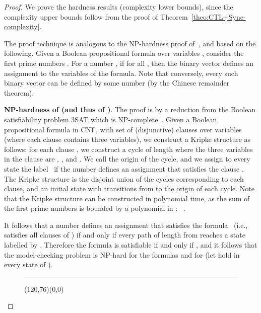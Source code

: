 \documentclass{article}
\begin{document}
\begin{proof}
We prove the hardness results (complexity lower bounds), since the complexity 
upper bounds follow from the proof of Theorem~\ref{theo:CTL+Sync-complexity}. 




The proof technique is analogous to the NP-hardness proof of~\cite[Theorem 6.1]{SM73},
and based on the following. Given a Boolean propositional formula  over variables
, consider the first  prime numbers . 
For a number , if  for all ,
then the binary vector  defines an assignment 
to the variables of the formula. Note that conversely, every such binary vector 
can be defined by some number  (by the Chinese remainder theorem).

{\bf NP-hardness of  (and thus of )}. 
The proof is by a reduction from the Boolean satisfiability problem 3SAT which is NP-complete~\cite{Cook71}.
Given a Boolean propositional formula  in CNF, with set  of (disjunctive) clauses
over variables  (where each clause contains three 
variables), we construct a Kripke structure  as follows:
for each clause , we construct a cycle  of length
 where the three variables in the clause are
, , and . We call  the origin of the cycle,
and we assign to every state  the label~ if the number  
defines an assignment that satisfies the clause .
The Kripke structure  is the disjoint union of the cycles corresponding to 
each clause, and an initial state  with transitions from  to the 
origin of each cycle. Note that the Kripke structure  can be constructed in 
polynomial time, as the sum of the first  prime numbers is bounded by a polynomial
in : ~\cite{BS96}.



It follows that a number  defines an assignment that satisfies the formula~ 
(i.e., satisfies all clauses of ) if and only if every path of 
length  from  reaches a state labelled by . 
Therefore the formula  is satisfiable if and only if ,
and it follows that the model-checking problem is NP-hard for the formulas 
 and for  (let  hold in every state of ).



\begin{figure}[!tb]
  \begin{center}
    	\hrule
		

\begin{gpicture}(120,76)(0,0)









\end{gpicture}
\end{center}
\end{figure}
\end{proof}
\end{document}
